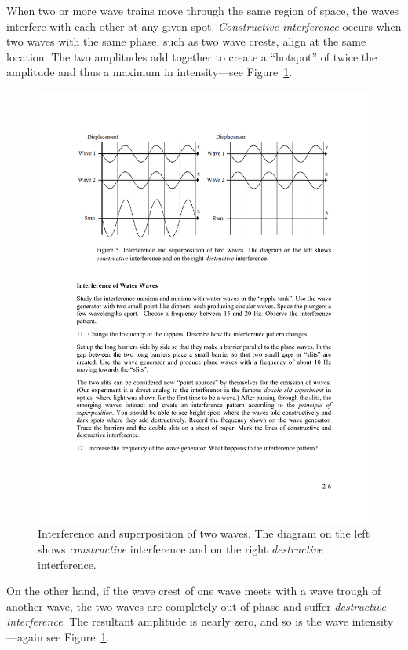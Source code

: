 \documentclass[11pt]{NSF}
\begin{document}
When two or more wave trains move through the same region of space, the waves
interfere with each other at any given spot. 
{\em Constructive interference} occurs
when two waves with the same phase, such as two wave crests, align at the same
location. The two amplitudes add together to create a ``hotspot” of twice the
amplitude and thus a maximum in intensity---see Figure~\ref{f:5}.
%
\begin{figure}[hbtp]
\begin{center}
\includegraphics[width=.95\textwidth]{fig2_5}
\caption{Interference and superposition of two waves. 
The diagram on the left
shows {\em constructive} interference and on the right 
{\em destructive} interference.}
\label{f:5}
\end{center}
\end{figure}
%

On the other hand, if the wave crest of one wave meets with a wave trough of
another wave, the two waves are completely out-of-phase and suffer 
{\em destructive interference}. The resultant amplitude is nearly zero, and so is the wave
intensity---again see Figure~\ref{f:5}.
\end{document}
